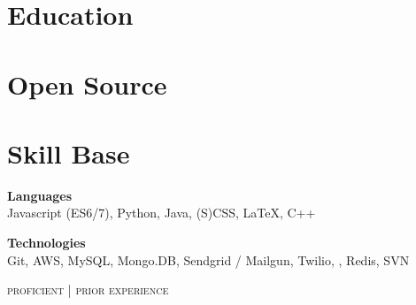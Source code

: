 \documentclass{article}
\begin{document}
\begin{minipage}[t]{0.38\textwidth}
  \vspace{0pt}

  \section{Education}

    

    

  \section{Open Source}

    

    

  \section{Skill Base}
  {\raggedright
    \textbf{Languages} \\
    {\small
      {\color{highlight}
        Javascript (ES6/7), Python, Java, (S)CSS,
      }
      LaTeX, C++
    }

    \vspace{5pt}

    \textbf{Technologies} \\
    {\small
      {\color{highlight}
        Git, AWS, MySQL, Mongo.DB, Sendgrid / Mailgun, Twilio,
      },
      Redis, SVN
    }

    \hfill\textsc{\footnotesize{{\color{highlight} proficient} | prior experience}}
  }
\end{minipage}
\end{document}
